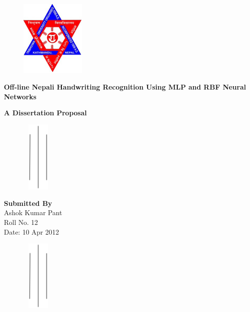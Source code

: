 \pagestyle{empty}
\begin{figure}[tp] %
\centering
\includegraphics[width=90pt]{figures/logo}
\end{figure}


\begin{center}
 {\Large \textbf{{Off-line Nepali Handwriting Recognition Using MLP and RBF Neural Networks }}}\par		%
 
 
 {\large \textbf{{A Dissertation Proposal}\\}}
  
\begin{figure}[hbtp]
 \centering
 \includegraphics[width=45pt,height=100pt]{figures/vlines}
\end{figure}
  
  {\Large \textbf{{Submitted By}\\}}	%
  {\Large Ashok Kumar Pant\\\large Roll No. 12\\ \large Date: 10 Apr 2012}\par
           
\begin{figure}[hbtp]
 \centering
 \includegraphics[width=45pt,height=100pt]{figures/vlines}
\end{figure}
  

\end{center}
